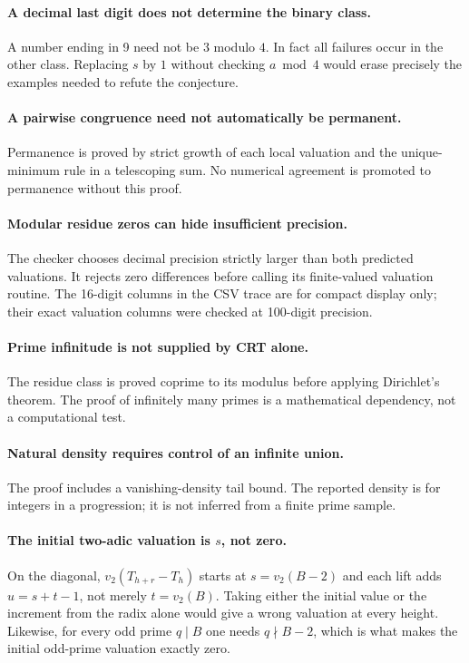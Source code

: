 \documentclass[11pt,letterpaper]{article}
\numberwithin{equation}{section}
\theoremstyle{definition}
\theoremstyle{remark}
\begin{document}
\paragraph{A decimal last digit does not determine the binary class.}
A number ending in 9 need not be $3$ modulo $4$. In fact all failures occur in the other class. Replacing $s$ by $1$ without checking $a\bmod4$ would erase precisely the examples needed to refute the conjecture.

\paragraph{A pairwise congruence need not automatically be permanent.}
Permanence is proved by strict growth of each local valuation and the unique-minimum rule in a telescoping sum. No numerical agreement is promoted to permanence without this proof.

\paragraph{Modular residue zeros can hide insufficient precision.}
The checker chooses decimal precision strictly larger than both predicted valuations. It rejects zero differences before calling its finite-valued valuation routine. The 16-digit columns in the CSV trace are for compact display only; their exact valuation columns were checked at 100-digit precision.

\paragraph{Prime infinitude is not supplied by CRT alone.}
The residue class is proved coprime to its modulus before applying Dirichlet's theorem. The proof of infinitely many primes is a mathematical dependency, not a computational test.

\paragraph{Natural density requires control of an infinite union.}
The proof includes a vanishing-density tail bound. The reported density is for integers in a progression; it is not inferred from a finite prime sample.

\paragraph{The initial two-adic valuation is $s$, not zero.}
On the diagonal, $v_2(T_{h+r}-T_h)$ starts at $s=v_2(B-2)$ and each lift adds $u=s+t-1$, not merely $t=v_2(B)$. Taking either the initial value or the increment from the radix alone would give a wrong valuation at every height. Likewise, for every odd prime $q\mid B$ one needs $q\nmid B-2$, which is what makes the initial odd-prime valuation exactly zero.
\end{document}
